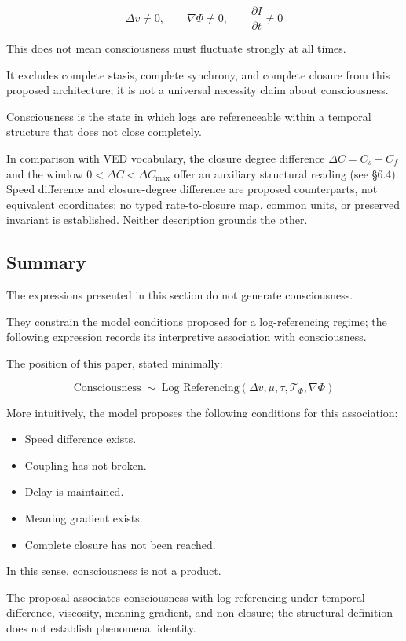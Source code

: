 \begin{equation}
\Delta v \neq 0, \qquad \nabla \Phi \neq 0, \qquad \frac{\partial I}{\partial t} \neq 0
\end{equation}

This does not mean consciousness must fluctuate strongly at all times.

It excludes complete stasis, complete synchrony, and complete closure from this proposed architecture; it is not a universal necessity claim about consciousness.

Consciousness is the state in which logs are referenceable within a temporal structure that does not close completely.

In comparison with VED vocabulary, the closure degree difference $\Delta C = C_s - C_f$ and the window $0 < \Delta C < \Delta C_{\max}$ offer an auxiliary structural reading (see §6.4). Speed difference and closure-degree difference are proposed counterparts, not equivalent coordinates: no typed rate-to-closure map, common units, or preserved invariant is established. Neither description grounds the other.

\subsection{Summary}


The expressions presented in this section do not generate consciousness.

They constrain the model conditions proposed for a log-referencing regime; the following expression records its interpretive association with consciousness.

The position of this paper, stated minimally:

\begin{equation}
\text{Consciousness} \;\sim\; \text{Log Referencing}\!\left(\Delta v, \mu, \tau, \mathcal{T}_{\Phi}, \nabla \Phi\right)
\end{equation}

More intuitively, the model proposes the following conditions for this association:

\begin{itemize}
\item Speed difference exists.
\item Coupling has not broken.
\item Delay is maintained.
\item Meaning gradient exists.
\item Complete closure has not been reached.
\end{itemize}

In this sense, consciousness is not a product.

The proposal associates consciousness with log referencing under temporal difference, viscosity, meaning gradient, and non-closure; the structural definition does not establish phenomenal identity.
